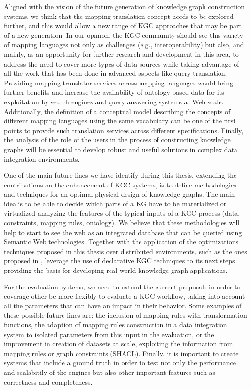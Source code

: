 Aligned with the vision of the future generation of knowledge graph construction systems, we think that the mapping translation concept needs to be explored further, and this would allow a new range of KGC approaches that may be part of a new generation. In our opinion, the KGC community should see this variety of mapping languages not only as challenges (e.g., interoperability) but also, and mainly, as an opportunity for further research and development in this area, to address the need to cover more types of data sources while taking advantage of all the work that has been done in advanced aspects like query translation. Providing mapping translator services across mapping languages would bring further benefits and increase the availability of ontology-based data for its exploitation by search engines and query answering systems at Web scale. Additionally, the definition of a conceptual model describing the concepts of different mapping languages using the same vocabulary can be one of the first points to provide such translation services across different specifications. Finally, the analysis of the role of the users in the process of constructing knowledge graphs will be essential to develop robust and useful solutions in complex data integration environments.

One of the main future lines we have identify during this thesis, extending the contributions on the enhancement of KGC systems, is to define methodologies and techniques for an optimal physical design of knowledge graphs. The main idea is to be able to decide which parts of a KG have to be materialized or virtualized analyzing the features of the typical inputs of a KGC process (data, constraints, mapping rules, ontology). We believe that these methodologies will help to start to see the web as an integrated database that can be queried using Semantic Web technologies. Together with the application of the optimizations techniques proposed in this thesis over distributed environments, such as the ones proposed in \citep{endris2019ontario,mami2019squerall}, leverage the use of declarative KGC techniques to its next steps providing the basis for developing real-world knowledge graph applications.

For the evaluation systems, we need to extend the current proposals in order to coverage other be more flexibly to evaluate a KGC workflow, taking into account all the parameters that can have an impact in their behavior. Some examples of these possible future lines are: the inclusion of mapping rules with transformation functions, the adaption of mapping rules construction in a data integration system to isolated parameters from this input in the evaluation, or the improvement in creation of datasets at scale, exploiting the information from mapping rules or graph constraints (SHACL). Finally, it is important to create systems that include a ground truth in order to test not only the performance and scalabitily of the engines but also other important features such as correctness and completeness.

